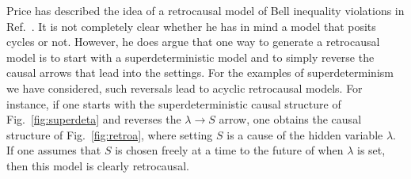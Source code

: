 \documentclass[letterpaper,onecolumn,nofootinbib]{revtex4}
\begin{document}
Price has described the idea of a retrocausal model of Bell inequality violations in Ref.~\cite{price1997time}.  It is not completely clear whether he has in mind a model that posits cycles or not.  However, he does argue that one way to generate a retrocausal model is to start with a superdeterministic model and to simply reverse the causal arrows that lead into the settings.  For the examples of superdeterminism we have considered, such reversals lead to acyclic retrocausal models.
For instance, if one starts with the superdeterministic causal structure of Fig.~\ref{fig:superdeta} and reverses the $\lambda \to S$ arrow, one obtains the causal structure of Fig.~\ref{fig:retroa}, where setting $S$ is a cause of the hidden variable $\lambda$.  If one assumes that $S$ is chosen freely at a time to the future of when $\lambda$ is set, then this model is clearly retrocausal.
\end{document}
